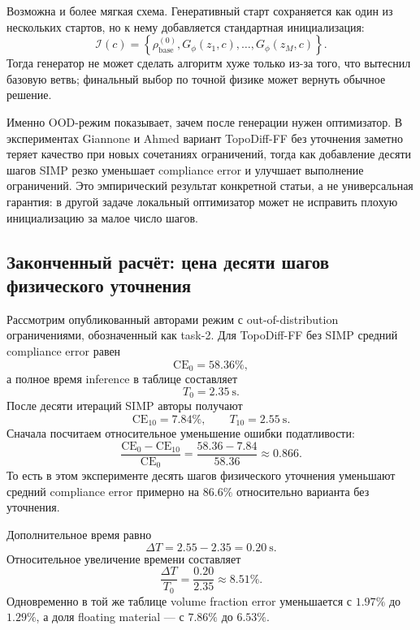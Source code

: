 Возможна и более мягкая схема. Генеративный старт сохраняется как один из нескольких стартов, но к нему добавляется стандартная инициализация:
\begin{equation}
 \mathcal I(c)
 =
 \left\{
  \rho_{\mathrm{base}}^{(0)},
  G_\phi(z_1,c),\ldots,G_\phi(z_M,c)
 \right\}.
\end{equation}
Тогда генератор не может сделать алгоритм хуже только из-за того, что вытеснил базовую ветвь; финальный выбор по точной физике может вернуть обычное решение.

Именно OOD-режим показывает, зачем после генерации нужен оптимизатор. В экспериментах Giannone и Ahmed вариант TopoDiff-FF без уточнения заметно теряет качество при новых сочетаниях ограничений, тогда как добавление десяти шагов SIMP резко уменьшает compliance error и улучшает выполнение ограничений. Это эмпирический результат конкретной статьи, а не универсальная гарантия: в другой задаче локальный оптимизатор может не исправить плохую инициализацию за малое число шагов.

\subsection{Законченный расчёт: цена десяти шагов физического уточнения}

Рассмотрим опубликованный авторами режим с out-of-distribution ограничениями, обозначенный как task-2. Для TopoDiff-FF без SIMP средний compliance error равен
\begin{equation}
 \mathrm{CE}_0=58.36\%,
\end{equation}
а полное время inference в таблице составляет
\begin{equation}
 T_0=2.35\ \mathrm{s}.
\end{equation}
После десяти итераций SIMP авторы получают
\begin{equation}
 \mathrm{CE}_{10}=7.84\%,
 \qquad
 T_{10}=2.55\ \mathrm{s}.
\end{equation}
Сначала посчитаем относительное уменьшение ошибки податливости:
\begin{equation}
 \frac{\mathrm{CE}_0-\mathrm{CE}_{10}}{\mathrm{CE}_0}
 =
 \frac{58.36-7.84}{58.36}
 \approx
 \boxed{0.866}.
\end{equation}
То есть в этом эксперименте десять шагов физического уточнения уменьшают средний compliance error примерно на $86.6\%$ относительно варианта без уточнения.

Дополнительное время равно
\begin{equation}
 \Delta T
 =2.55-2.35
 =0.20\ \mathrm{s}.
\end{equation}
Относительное увеличение времени составляет
\begin{equation}
 \frac{\Delta T}{T_0}
 =
 \frac{0.20}{2.35}
 \approx
 \boxed{8.51\%}.
\end{equation}
Одновременно в той же таблице volume fraction error уменьшается с $1.97\%$ до $1.29\%$, а доля floating material --- с $7.86\%$ до $6.53\%$.

